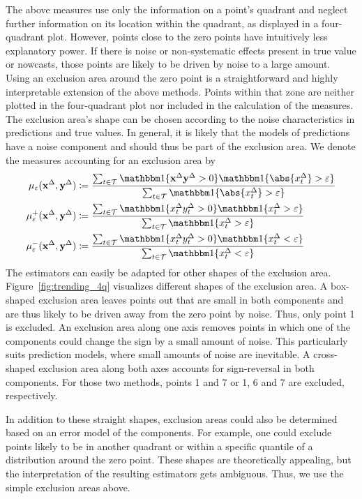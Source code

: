 The above measures use only the information on a point's quadrant and neglect further information on its location within the quadrant, as displayed in a four-quadrant plot.
However, points close to the zero points have intuitively less explanatory power.
If there is noise or non-systematic effects present in true value or nowcasts, those points are likely to be driven by noise to a large amount.
Using an exclusion area around the zero point is a straightforward and highly interpretable extension of the above methods.
Points within that zone are neither plotted in the four-quadrant plot nor included in the calculation of the measures.
The exclusion area's shape can be chosen according to the noise characteristics in predictions and true values.
In general, it is likely that the models of predictions have a noise component and should thus be part of the exclusion area.
We denote the measures accounting for an exclusion area by
\begin{align}
    \acceps (\diffx, \diffy) &\coloneqq \frac{\sum_{t \in \mathcal{T}} \ind{\diffx \diffy > 0} \ind{\abs{\diffxt} > \varepsilon}}{\sum_{t \in \mathcal{T}} \ind{\abs{\diffxt} > \varepsilon}}\label{eq:acceps}\\
    \accpeps (\diffx, \diffy) &\coloneqq \frac{\sum_{t \in \mathcal{T}} \ind{\diffxt \diffyt > 0} \ind{\diffxt > \varepsilon}}{\sum_{t \in \mathcal{T}} \ind{\diffxt > \varepsilon}} \label{eq:accpeps}\\
    \accmeps (\diffx, \diffy) &\coloneqq \frac{\sum_{t \in \mathcal{T}} \ind{\diffxt \diffyt > 0} \ind{\diffxt < \varepsilon}}{\sum_{t \in \mathcal{T}} \ind{\diffxt < \varepsilon }}\label{eq:accmeps}
\end{align}
The estimators can easily be adapted for other shapes of the exclusion area.
Figure~\ref{fig:trending_4q} visualizes different shapes of the exclusion area.
A box-shaped exclusion area leaves points out that are small in both components and are thus likely to be driven away from the zero point by noise.
Thus, only point 1 is excluded.
An exclusion area along one axis removes points in which one of the components could change the sign by a small amount of noise.
This particularly suits prediction models, where small amounts of noise are inevitable.
A cross-shaped exclusion area along both axes accounts for sign-reversal in both components.
For those two methods, points 1 and 7 or 1, 6 and 7 are excluded, respectively.

In addition to these straight shapes, exclusion areas could also be determined based on an error model of the components.
For example, one could exclude points likely to be in another quadrant or within a specific quantile of a distribution around the zero point.
These shapes are theoretically appealing, but the interpretation of the resulting estimators gets ambiguous.
Thus, we use the simple exclusion areas above.

